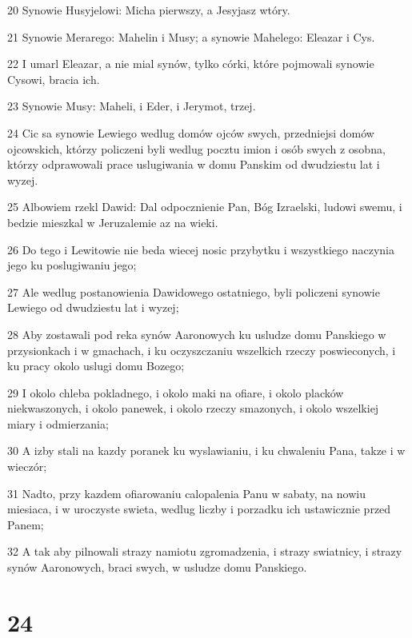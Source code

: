 \par 20 Synowie Husyjelowi: Micha pierwszy, a Jesyjasz wtóry.
\par 21 Synowie Merarego: Mahelin i Musy; a synowie Mahelego: Eleazar i Cys.
\par 22 I umarl Eleazar, a nie mial synów, tylko córki, które pojmowali synowie Cysowi, bracia ich.
\par 23 Synowie Musy: Maheli, i Eder, i Jerymot, trzej.
\par 24 Cic sa synowie Lewiego wedlug domów ojców swych, przedniejsi domów ojcowskich, którzy policzeni byli wedlug pocztu imion i osób swych z osobna, którzy odprawowali prace uslugiwania w domu Panskim od dwudziestu lat i wyzej.
\par 25 Albowiem rzekl Dawid: Dal odpocznienie Pan, Bóg Izraelski, ludowi swemu, i bedzie mieszkal w Jeruzalemie az na wieki.
\par 26 Do tego i Lewitowie nie beda wiecej nosic przybytku i wszystkiego naczynia jego ku poslugiwaniu jego;
\par 27 Ale wedlug postanowienia Dawidowego ostatniego, byli policzeni synowie Lewiego od dwudziestu lat i wyzej;
\par 28 Aby zostawali pod reka synów Aaronowych ku usludze domu Panskiego w przysionkach i w gmachach, i ku oczyszczaniu wszelkich rzeczy poswieconych, i ku pracy okolo uslugi domu Bozego;
\par 29 I okolo chleba pokladnego, i okolo maki na ofiare, i okolo placków niekwaszonych, i okolo panewek, i okolo rzeczy smazonych, i okolo wszelkiej miary i odmierzania;
\par 30 A izby stali na kazdy poranek ku wyslawianiu, i ku chwaleniu Pana, takze i w wieczór;
\par 31 Nadto, przy kazdem ofiarowaniu calopalenia Panu w sabaty, na nowiu miesiaca, i w uroczyste swieta, wedlug liczby i porzadku ich ustawicznie przed Panem;
\par 32 A tak aby pilnowali strazy namiotu zgromadzenia, i strazy swiatnicy, i strazy synów Aaronowych, braci swych, w usludze domu Panskiego.

\chapter{24}

